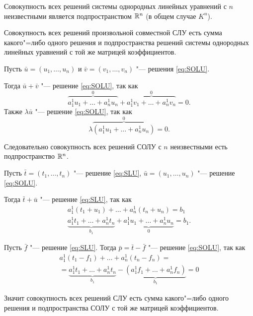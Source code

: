 \begin{theorem}
    Совокупность всех решений системы однородных линейных уравнений с $n$ неизвестными является подпространством $\mathbb{R}^n$ (в общем случае $K^n$).

    Совокупность всех решений произвольной совместной СЛУ есть сумма какого"=либо одного решения и подпространства решений системы однородных линейных уравнений с той же матрицей коэффициентов.
\end{theorem}
\begin{Proof}
    Пусть $\bar{u} = (u_1, \ldots, u_n)$ и $\bar{v} = (v_1, \ldots, v_n)$ "--- решения \ref{eq:SOLU}.

    Тогда $\bar{u} + \bar{v}$ "--- решение \ref{eq:SOLU}, так как
    \begin{equation*}
        \overbrace{a_1^1u_1 + \ldots + a_n^1u_n}^0 + \overbrace{a_1^1v_1 + \ldots + a_n^1v_n}^0 = 0.
    \end{equation*}
    Также $\lambda\bar{u}$ "--- решение \ref{eq:SOLU}, так как 
    \begin{equation*}
        \lambda\overbrace{(a_1^1u_1 + \ldots + a_n^1u_n)}^0 = 0.
    \end{equation*}

    Следовательно совокупность всех решений СОЛУ с $n$ неизвестными есть подпространство $\mathbb{R}^n$.

    Пусть $\bar{t} = (t_1, \ldots, t_n)$ "--- решение \ref{eq:SLU}, $\bar{u} = (u_1, \ldots, u_n)$ "--- решение \ref{eq:SOLU}.
    
    Тогда $\bar{t} + \bar{u}$ "--- решение \ref{eq:SLU}, так как
    \begin{gather*}
        a_1^1(t_1 + u_1) + \ldots + a_n^1(t_n + u_n) = b_1 \\
        \underbrace{a_1^1t_1 + \ldots + a_n^1t_n}_{b_1} + \underbrace{a_1^1u_1 + \ldots + a_n^1u_n}_0 = b_1.
    \end{gather*}

    Пусть $\bar{f}$ "--- решение \ref{eq:SLU}. Тогда $\bar{p} = \bar{t} - \bar{f}$ "--- решение \ref{eq:SOLU}, так как
    \begin{gather*}
        a_1^1(t_1 - f_1) + \ldots + a_n^1(t_n - f_n) = \\ = \underbrace{a_1^1t_1 + \ldots + a_n^1t_n}_{b_1} - \underbrace{(a_1^1f_1 + \ldots + a_n^1f_n)}_{b_1} = 0
    \end{gather*}

    Значит совокупность всех решений СЛУ есть сумма какого"=либо одного решения и подпространства СОЛУ с той же матрицей коэффициентов.
\end{Proof}


